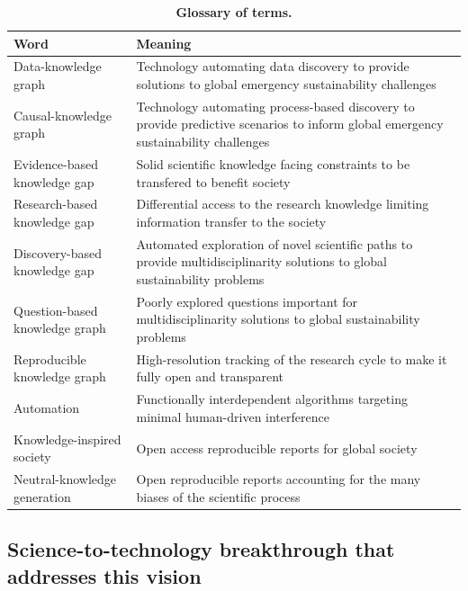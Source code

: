 \documentclass[12pt, a4paper]{article} %
\begin{document}
   
\begin{table}[ht]
\begin{tabular}{ p{6cm} | p{11cm}}
  \hline \hline
  \textbf{Word} &\textbf{Meaning}\\  \hline
  Data-knowledge graph & Technology automating data discovery to provide solutions to global emergency sustainability challenges\\ \hline
  Causal-knowledge graph & Technology automating process-based discovery to provide predictive scenarios to inform global emergency sustainability challenges\\ \hline
  Evidence-based knowledge gap & Solid scientific knowledge facing constraints to be transfered to benefit society\\ \hline
  Research-based knowledge gap & Differential access to the research knowledge limiting information transfer to the society \\ \hline
  Discovery-based knowledge gap & Automated exploration of novel scientific paths to provide multidisciplinarity solutions to global sustainability problems\\ \hline
  Question-based knowledge graph & Poorly explored questions important for multidisciplinarity solutions to global sustainability problems\\ \hline
  Reproducible knowledge graph & High-resolution tracking of the research cycle to make it fully open and transparent\\ \hline
  Automation & Functionally interdependent algorithms targeting minimal human-driven interference\\ \hline
  Knowledge-inspired society & Open access reproducible reports for global society \\ \hline
  Neutral-knowledge generation & Open reproducible reports accounting for the many biases of the scientific process\\ \hline
  \bottomrule
\end{tabular}
\caption{{\bf Glossary of terms.}}
\end{table}


\subsection{Science-to-technology breakthrough that addresses this vision}
\end{document}
